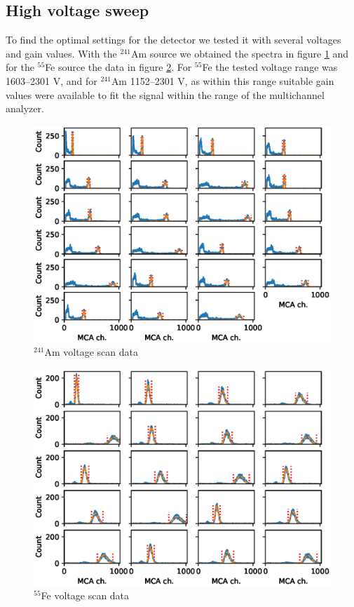 \documentclass[a4paper]{article}
\begin{document}
\clearpage
\subsection{High voltage sweep}
\label{results_hv}
To find the optimal settings for the detector we tested it with several voltages and gain values.
With the $^{241}$Am source we obtained the spectra in figure \ref{fig:am_scan_fits} and for the $^{55}$Fe source the data in figure \ref{fig:fe_scan_fits}.
For $^{55}$Fe the tested voltage range was 1603--2301 V, and for $^{241}$Am 1152--2301 V, as within this range suitable gain values were available to fit the signal within the range of the multichannel analyzer.

\begin{figure}[ht!]
\centering
\includegraphics[width=\textwidth]{fig/python/am_scan_fits.eps}
\caption{$^{241}$Am voltage scan data}
\label{fig:am_scan_fits}
\end{figure}

\begin{figure}[ht!]
\centering
\includegraphics[width=\textwidth]{fig/python/fe_scan_fits.eps}
\caption{$^{55}$Fe voltage scan data}
\label{fig:fe_scan_fits}
\end{figure}
\end{document}
